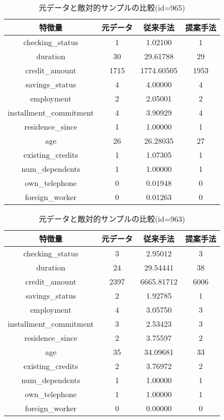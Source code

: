 \begin{table}[H]
    \centering
    \caption{元データと敵対的サンプルの比較(id=965)}
    \begin{tabular}{|c|c|c|c|} \hline
        特徴量 & 元データ & 従来手法 & 提案手法 \\ \hline
        checking\_status & 1 & 1.02100 & 1 \\ \hline
        duration & 30 & 29.61788 & 29 \\ \hline
        credit\_amount & 1715 & 1774.60505 & 1953 \\ \hline
        savings\_status & 4 & 4.00000 & 4 \\ \hline
        employment & 2 & 2.05001 & 2 \\ \hline
        installment\_commitment & 4 & 3.90929 & 4 \\ \hline
        residence\_since & 1 & 1.00000 & 1 \\ \hline
        age & 26 & 26.28035 & 27 \\ \hline
        existing\_credits & 1 & 1.07305 & 1 \\ \hline
        num\_dependents & 1 & 1.00000 & 1 \\ \hline
        own\_telephone & 0 & 0.01948 & 0 \\ \hline
        foreign\_worker & 0 & 0.01263 & 0 \\ \hline
    \end{tabular}
\end{table}

\begin{table}[H]
    \centering
    \caption{元データと敵対的サンプルの比較(id=963)}
    \begin{tabular}{|c|c|c|c|} \hline
        特徴量 & 元データ & 従来手法 & 提案手法 \\ \hline
        checking\_status & 3 & 2.95012 & 3 \\ \hline
        duration & 24 & 29.54441 & 38 \\ \hline
        credit\_amount & 2397 & 6665.81712 & 6006 \\ \hline
        savings\_status & 2 & 1.92785 & 1 \\ \hline
        employment & 4 & 3.05750 & 3 \\ \hline
        installment\_commitment & 3 & 2.53423 & 3 \\ \hline
        residence\_since & 2 & 3.75597 & 2 \\ \hline
        age & 35 & 34.09681 & 33 \\ \hline
        existing\_credits & 2 & 3.76972 & 2 \\ \hline
        num\_dependents & 1 & 1.00000 & 1 \\ \hline
        own\_telephone & 1 & 1.00000 & 1 \\ \hline
        foreign\_worker & 0 & 0.00000 & 0 \\ \hline
    \end{tabular}
\end{table}

